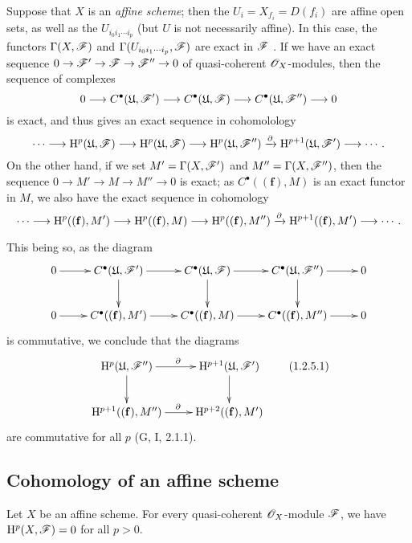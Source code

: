 \begin{rmk}[1.2.5]
\label{3.1.2.5}
Suppose that $X$ is an \emph{affine scheme}; then the $U_i=X_{f_i}=D(f_i)$ are affine open sets, as well as the $U_{i_0 i_1\cdots i_p}$ (but $U$ is not necessarily affine).
In this case, the functors $\Gamma(X,\mathscr{F})$ and $\Gamma(U_{i_0 i_1\cdots i_p},\mathscr{F})$ are exact in $\mathscr{F}$ .
If we have an exact sequence $0\to\sh{F}'\to\sh{F}\to\sh{F}''\to 0$ of quasi-coherent $\mathscr{O}_X$-modules, then the sequence of complexes
\[
  0\to C^\bullet(\fk{U},\sh{F}')\to C^\bullet(\fk{U},\sh{F})\to C^\bullet(\fk{U},\sh{F}'')\to 0
\]
is exact, and thus gives an exact sequence in cohomolology
\[
  \cdots\to\HH^p(\fk{U},\sh{F})\to\HH^p(\fk{U},\sh{F})\to\HH^p(\fk{U},\sh{F}'')\xrightarrow{\partial}\HH^{p+1}(\fk{U},\sh{F}')\to\cdots.
\]
On the other hand, if we set $M'=\Gamma(X,\mathscr{F}')$ and $M''=\Gamma(X,\mathscr{F}'')$, then the sequence $0\to M'\to M\to M''\to 0$ is exact; as $C^\bullet((\mathbf{f}),M)$ is an exact functor in $M$, we also have the exact sequence in cohomology
\[
  \cdots\to\HH^p((\mathbf{f}),M')\to\HH^p((\mathbf{f}),M)\to\HH^p((\mathbf{f}),M'')\xrightarrow{\partial}\HH^{p+1}((\mathbf{f}),M')\to\cdots.
\]

This being so, as the diagram
\[
  \xymatrix{
    0\ar[r] &
    C^\bullet(\fk{U},\sh{F}')\ar[r]\ar[d] &
    C^\bullet(\fk{U},\sh{F})\ar[r]\ar[d] &
    C^\bullet(\fk{U},\sh{F}'')\ar[r]\ar[d] &
    0\\
    0\ar[r] &
    C^\bullet((\mathbf{f}),M')\ar[r] &
    C^\bullet((\mathbf{f}),M)\ar[r] &
    C^\bullet((\mathbf{f}),M'')\ar[r] &
    0
  }
\]
is commutative, we conclude that the diagrams
\[
  \xymatrix{
    \HH^p(\fk{U},\sh{F}'')\ar[r]^\partial\ar[d] &
    \HH^{p+1}(\fk{U},\sh{F}')\ar[d]\\
    \HH^{p+1}((\mathbf{f}),M'')\ar[r]^\partial &
    \HH^{p+2}((\mathbf{f}),M')
  }
  \tag{1.2.5.1}
\]
are commutative for all $p$ (G, I, 2.1.1).
\end{rmk}

\subsection{Cohomology of an affine scheme}
\label{subsection:cohomology-affine-scheme}

\begin{thm}[1.3.1]
\label{3.1.3.1}
Let $X$ be an affine scheme.
For every quasi-coherent $\mathscr{O}_X$-module $\mathscr{F}$, we have $\mathrm{H}^p(X,\mathscr{F})=0$ for all $p>0$.
\end{thm}

